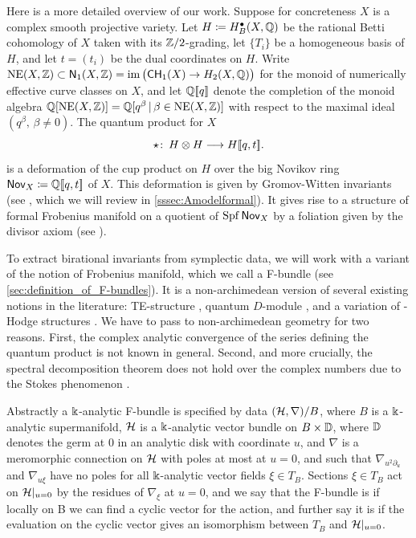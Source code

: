 \documentclass[twoside,leqno]{article}
\numberwithin{equation}{section}
\theoremstyle{plain}
\theoremstyle{definition}
\begin{document}
Here is a more detailed overview of our work. Suppose for concreteness $X$ is a complex smooth projective variety. 
Let $H\coloneqq H^{\bullet}_{B}(X,\mathbb Q )$  be the rational Betti cohomology of $X$ taken with its \linebreak $\mathbb Z/2$-grading, let 
$\{T_i\}$ be a homogeneous basis of $H$, and let $t=(t_i)$ be the dual coordinates on $H$.
Write $\operatorname{NE}(X,\mathbb Z) \subset \mathsf{N}_{1}(X,\mathbb Z) = \operatorname{im}\big(\mathsf{CH}_{1}(X) \to H_{2}(X,\mathbb Q)\big)$ for the monoid of numerically effective curve classes  on $X$, and let
$\mathbb Q [\![q]\!]$ denote the completion of the monoid algebra \linebreak $\mathbb Q [\operatorname{NE} (X,\mathbb Z )] = \mathbb Q [q^{\beta}\, \vert\, \beta\in \operatorname{NE} (X,\mathbb Z )]$ with respect to the maximal ideal $(q^{\beta} , \,\beta\neq 0)$.
The quantum product for $X$
\[
\star \colon \, H\otimes H \longrightarrow H[\![q,t]\!].
\]
is a deformation of the cup product on $H$ over the big Novikov ring $\mathsf{Nov}_{X} \coloneqq \mathbb Q[\![q,t]\!]$ of $X$. This deformation is  
given by Gromov-Witten invariants (see \cite{Kontsevich_Gromov-Witten_classes}, which we will review in \cref{sssec:Amodelformal}).
It gives rise to a structure of formal Frobenius manifold on a quotient of $\operatorname{Spf} \mathsf{Nov}_{X}$ by a foliation given by the divisor axiom (see \cite{Dubrovin_Geometry_of_2D,Manin_Frobenius_manifolds}).

\medskip

To extract  birational invariants from symplectic data, we will work with a variant of the notion of Frobenius manifold, which we call a F-bundle (see \cref{sec:definition_of_F-bundles}).
It is a non-archimedean version of several existing notions in the literature: TE-structure \cite{hertling_tt*_geometry,hertling-frobenius}, quantum $D$-module \cite{Iritani_Quantum_D-modules}, and a variation of \nc-Hodge structures \cite{Katzarkov_Hodge_theoretic_aspects}.
We have to pass to non-archimedean geometry for two reasons. First, the complex analytic convergence of the series defining the
quantum product is not known in general. 
Second, and more crucially, the spectral decomposition theorem does not hold over the complex numbers due to the Stokes phenomenon \cite{Katzarkov_Hodge_theoretic_aspects,HYZZ_Decomposition}.

Abstractly a $\Bbbk$-analytic  F-bundle is specified by data $(\mathcal H,\nabla)/B$, where $B$ is a $\Bbbk$-analytic supermanifold, $\mathcal H$ is a $\Bbbk$-analytic vector bundle on $B\times \mathbb D$, where $\mathbb D$ denotes the germ at $0$ in an analytic disk with coordinate $u$, and $\nabla$ is a meromorphic connection on $\mathcal H$ with  poles at most at $u =0$, and such that 
$\nabla_{u^{2}\partial_{u}}$ and $\nabla_{u\xi}$ have no poles for all $\Bbbk$-analytic vector 
fields $\xi \in T_{B}$. Sections $\xi \in T_{B}$ act on $\mathcal H|_{u=0}$ by the residues of $\nabla_{\xi}$ at $u=0$, and we say that the F-bundle is  if locally on B we can find a cyclic vector for the action, and further say it is   if the evaluation on the cyclic vector gives an isomorphism between $T_{B}$ and $\mathcal H|_{u=0}$. 
\end{document}
